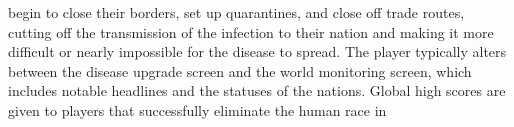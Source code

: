 begin to close their borders, set up quarantines, and close off trade routes, cutting off the transmission of the infection to their nation and making it more difficult or nearly impossible for the disease to spread. The player typically alters between the disease upgrade screen and the world monitoring screen, which includes notable headlines and the statuses of the nations. Global high scores are given to players that successfully eliminate the human race in 